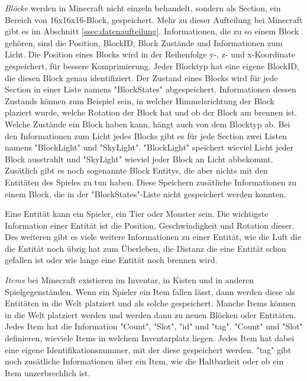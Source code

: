 \textit{Blöcke} werden in Minecraft nicht einzeln behandelt, sondern als Section, ein Bereich von 16x16x16-Block, gespeichert. Mehr zu dieser Aufteilung bei Minecraft gibt es im Abschnitt \ref{ssec:datenaufteilung}. Informationen, die zu so einem Block gehören, sind die Position, BlockID, Block Zustände und Informationen zum Licht. Die Position eines Blocks wird in der Reihenfolge y-, z- und x-Koordinate gespeichert, für bessere Komprimierung. Jeder Blocktyp hat eine eigene BlockID, die diesen Block genau identifiziert. Der Zustand eines Blocks wird für jede Section in einer Liste namens "BlockStates" abgespeichert. Informationen dessen Zustands können zum Beispiel sein, in welcher Himmelsrichtung der Block plaziert wurde, welche Rotation der Block hat und ob der Block am brennen ist. Welche Zustände ein Block haben kann, hängt auch von dem Blocktyp ab.\cite{minecraftBlockStates} Bei den Informationen zum Licht jedes Blocks gibt es für jede Section zwei Listen namens "BlockLight" und "SkyLight". "BlockLight" speichert wieviel Licht jeder Block ausstrahlt und "SkyLight" wieviel jeder Block an Licht abbekommt. Zusätlich gibt es noch sogenannte Block Entitys, die aber nichts mit den Entitäten des Spieles zu tun haben. Diese Speichern zusätliche Informationen zu einem Block, die in der "BlockStates"-Liste nicht gespeichert werden konnten.\cite{minecraftChunkFormat}

Eine Entität kann ein Spieler, ein Tier oder Monster sein. Die wichtigste Information einer Entität ist die Position, Geschwindigkeit und Rotation dieser. Des weiteren gibt es viele weitere Informationen zu einer Entität, wie die Luft die die Entität noch übrig hat zum Überleben, die Distanz die eine Entität schon gefallen ist oder wie lange eine Entität noch brennen wird.\cite{minecraftEntityFormat}

\textit{Items} bei Minecraft existieren im Inventar, in Kisten und in anderen Spielgegenständen. Wenn ein Spieler ein Item fallen lässt, dann werden diese als Entitäten in die Welt platziert und als solche gespeichert. Manche Items können in die Welt platziert werden und werden dann zu neuen Blöcken oder Entitäten. Jedes Item hat die Information "Count", "Slot", "id" und "tag". "Count" und "Slot" definieren, wieviele Items in welchem Inventarplatz liegen. Jedes Item hat dabei eine eigene Identifikationsnummer, mit der diese gespeichert werden. "tag" gibt noch zusätliche Informationen über ein Item, wie die Haltbarkeit oder ob ein Item unzerbrechlich ist.
\cite{minecraftPlayerdatFormat}
\cite{minecraftItem}

